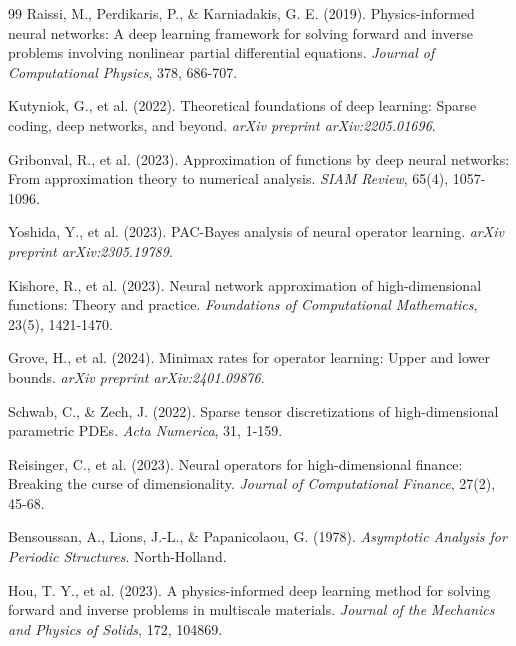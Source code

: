 \documentclass[12pt,a4paper,twoside]{article}
\begin{document}
\begin{inversation}
\begin{thebibliography}{99}
\vspace{0.2cm}
\noindent[4] Raissi, M., Perdikaris, P., \& Karniadakis, G. E. (2019). Physics-informed neural networks: A deep learning framework for solving forward and inverse problems involving nonlinear partial differential equations. \textit{Journal of Computational Physics}, 378, 686-707.

\vspace{0.2cm}
\noindent[5] Kutyniok, G., et al. (2022). Theoretical foundations of deep learning: Sparse coding, deep networks, and beyond. \textit{arXiv preprint arXiv:2205.01696}.

\vspace{0.2cm}
\noindent[6] Gribonval, R., et al. (2023). Approximation of functions by deep neural networks: From approximation theory to numerical analysis. \textit{SIAM Review}, 65(4), 1057-1096.

\vspace{0.2cm}
\noindent[7] Yoshida, Y., et al. (2023). PAC-Bayes analysis of neural operator learning. \textit{arXiv preprint arXiv:2305.19789}.

\vspace{0.2cm}
\noindent[8] Kishore, R., et al. (2023). Neural network approximation of high-dimensional functions: Theory and practice. \textit{Foundations of Computational Mathematics}, 23(5), 1421-1470.

\vspace{0.2cm}
\noindent[9] Grove, H., et al. (2024). Minimax rates for operator learning: Upper and lower bounds. \textit{arXiv preprint arXiv:2401.09876}.

\vspace{0.2cm}
\noindent[10] Schwab, C., \& Zech, J. (2022). Sparse tensor discretizations of high-dimensional parametric PDEs. \textit{Acta Numerica}, 31, 1-159.

\vspace{0.2cm}
\noindent[11] Reisinger, C., et al. (2023). Neural operators for high-dimensional finance: Breaking the curse of dimensionality. \textit{Journal of Computational Finance}, 27(2), 45-68.

\vspace{0.2cm}
\noindent[12] Bensoussan, A., Lions, J.-L., \& Papanicolaou, G. (1978). \textit{Asymptotic Analysis for Periodic Structures}. North-Holland.

\vspace{0.2cm}
\noindent[13] Hou, T. Y., et al. (2023). A physics-informed deep learning method for solving forward and inverse problems in multiscale materials. \textit{Journal of the Mechanics and Physics of Solids}, 172, 104869.


\end{thebibliography}
\end{inversation}
\end{document}
